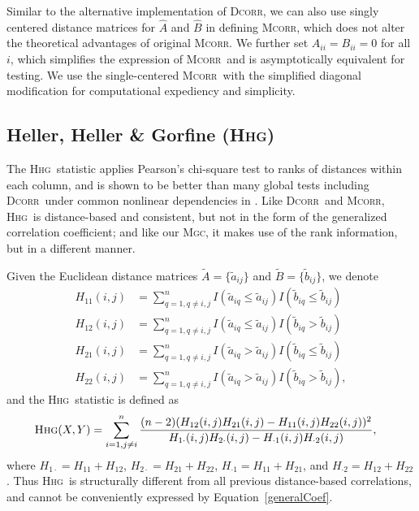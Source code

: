 \documentclass[11pt]{article}
\newcommand{\note}[2][]{\added[#1,remark={#2}]{}}
\providecommand{\sct}[1]{{\normalfont\textsc{#1}}}
\newcommand{\Mgc}{\sct{Mgc}}
\newcommand{\Hhg}{\sct{Hhg}}
\newcommand{\Dcorr}{\sct{Dcorr}}
\newcommand{\Mcorr}{\sct{Mcorr}}
\newcommand{\cs}[1]{{\note{cs: #1}}}
\begin{document}
Similar to the alternative implementation of \Dcorr, we can also use singly centered distance matrices for $\hat{A}$ and $\hat{B}$ in defining \Mcorr, which does not alter the theoretical advantages of original \Mcorr. We further set $A_{ii}=B_{ii}=0$ for all $i$, which simplifies the expression of \Mcorr~and is asymptotically equivalent for testing. 
\cs{another lemma or two here.}
We use the single-centered \Mcorr~with the simplified diagonal modification for computational expediency and simplicity.


\subsection{Heller, Heller \& Gorfine (\Hhg)}
\label{appen:hhg}

The \Hhg~statistic applies Pearson's chi-square test to ranks of distances within each column, and is shown to be better than many global tests including \Dcorr~under common nonlinear dependencies in \cite{GorfineHellerHeller2012, HellerGorfine2013}. Like \Dcorr~and \Mcorr, \Hhg~is distance-based and consistent, but not in the form of the generalized correlation coefficient; and like our \Mgc, it makes use of the rank information, but in a different manner.

Given the Euclidean distance matrices $\tilde{A}=\{\tilde{a}_{ij}\}$ and $\tilde{B}=\{\tilde{b}_{ij}\}$, we denote
\begin{align*}
H_{11}(i,j) &= \sum_{q=1,q\neq i,j}^{n}I(\tilde{a}_{iq} \leq \tilde{a}_{ij})I(\tilde{b}_{iq} \leq \tilde{b}_{ij}) \\
H_{12}(i,j) &= \sum_{q=1,q\neq i,j}^{n}I(\tilde{a}_{iq} \leq \tilde{a}_{ij})I(\tilde{b}_{iq} > \tilde{b}_{ij}) \\
H_{21}(i,j) &= \sum_{q=1,q\neq i,j}^{n}I(\tilde{a}_{iq} > \tilde{a}_{ij})I(\tilde{b}_{iq} \leq \tilde{b}_{ij}) \\
H_{22}(i,j) &= \sum_{q=1,q\neq i,j}^{n}I(\tilde{a}_{iq} > \tilde{a}_{ij})I(\tilde{b}_{iq} > \tilde{b}_{ij}),
\end{align*}
and the \Hhg~statistic is defined as
\begin{align*}
\Hhg(X,Y) &= \sum_{i=1,j\neq i}^{n} \frac{(n-2)(H_{12}(i,j)H_{21}(i,j)-H_{11}(i,j)H_{22}(i,j))^2}{H_{1 \cdot}(i,j)H_{2 \cdot}(i,j)-H_{\cdot 1}(i,j)H_{\cdot 2}(i,j)},
\end{align*}
where $H_{1 \cdot}=H_{11}+H_{12}$, $H_{2 \cdot}=H_{21}+H_{22}$, $H_{\cdot 1}=H_{11}+H_{21}$, and $H_{\cdot 2}=H_{12}+H_{22}$. Thus \Hhg~is structurally different from all previous distance-based correlations, and cannot be conveniently expressed by Equation~\ref{generalCoef}.
\end{document}
